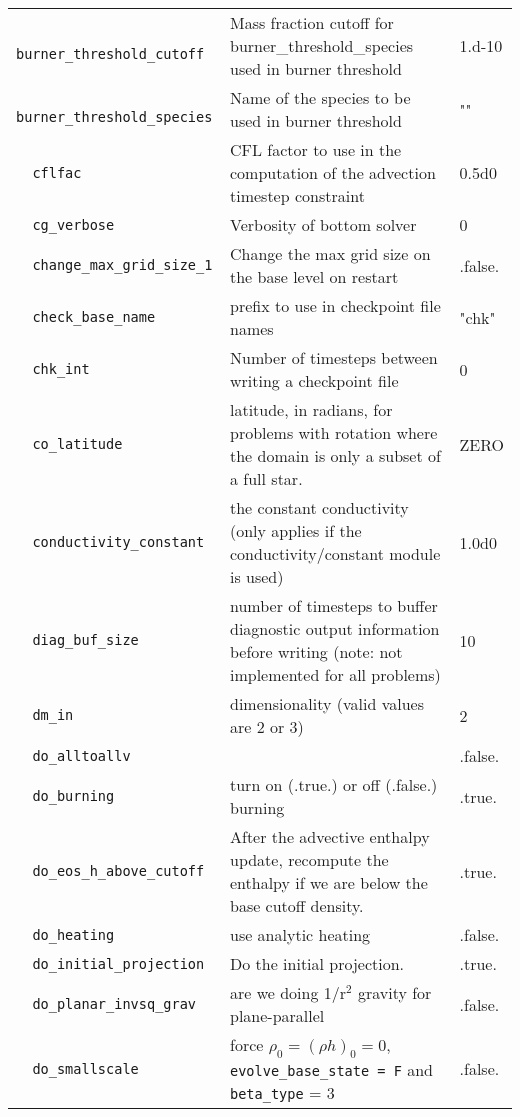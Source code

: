 \begin{landscape}
{\begin{center}
\begin{longtable}{|l|p{5.25in}|l|}
\rowcolor{tableShade}
\verb=  burner_threshold_cutoff  = &   Mass fraction cutoff for burner\_threshold\_species  used in burner threshold  &  1.d-10 \\
\verb=  burner_threshold_species  = &   Name of the species to be used in burner threshold  &  "" \\
\rowcolor{tableShade}
\verb=  cflfac  = &   CFL factor to use in the computation of the advection timestep constraint  &  0.5d0 \\
\verb=  cg_verbose  = &   Verbosity of bottom solver  &  0 \\
\rowcolor{tableShade}
\verb=  change_max_grid_size_1  = &   Change the max grid size on the base level on restart  &  .false. \\
\verb=  check_base_name  = &   prefix to use in checkpoint file names  &  "chk" \\
\rowcolor{tableShade}
\verb=  chk_int  = &   Number of timesteps between writing a checkpoint file  &  0 \\
\verb=  co_latitude  = &   latitude, in radians, for problems with rotation where the domain is only a subset of a full star.  &  ZERO \\
\rowcolor{tableShade}
\verb=  conductivity_constant  = &   the constant conductivity (only applies if the conductivity/constant module is used)  &  1.0d0 \\
\verb=  diag_buf_size  = &   number of timesteps to buffer diagnostic output information before writing (note: not implemented for all problems)  &  10 \\
\rowcolor{tableShade}
\verb=  dm_in  = &   dimensionality (valid values are 2 or 3)  &  2 \\
\verb=  do_alltoallv  = &    &  .false. \\
\rowcolor{tableShade}
\verb=  do_burning  = &   turn on (.true.) or off (.false.) burning  &  .true. \\
\verb=  do_eos_h_above_cutoff  = &   After the advective enthalpy update, recompute the enthalpy if we are below the base cutoff density.  &  .true. \\
\rowcolor{tableShade}
\verb=  do_heating  = &   use analytic heating  &  .false. \\
\verb=  do_initial_projection  = &   Do the initial projection.  &  .true. \\
\rowcolor{tableShade}
\verb=  do_planar_invsq_grav  = &   are we doing 1/r$^2$ gravity for plane-parallel  &  .false. \\
\verb=  do_smallscale  = &   force $\rho_0 = (\rho h)_0 = 0$, {\tt evolve\_base\_state = F} and {\tt beta\_type} = 3  &  .false. \\

\end{longtable}
\end{center}}
\end{landscape}

